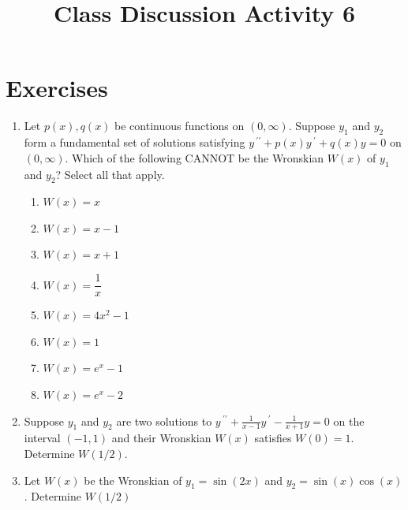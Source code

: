 \documentclass{ximera}
\begin{document}
\begin{abstract}
 \end{abstract}

    \title{Class Discussion Activity 6}
    
    \maketitle

\section*{Exercises}



\begin{enumerate}[label=(\arabic*)]

\item Let $p(x),q(x)$ be continuous functions on $(0,\infty)$.  Suppose $y_1$ and $y_2$ form a fundamental set of solutions satisfying $\displaystyle y\,^{\prime\prime}+p(x)y\,^{\prime}+q(x)y=0$ on $(0,\infty)$.  Which of the following CANNOT be the Wronskian $W(x)$ of $y_1$ and $y_2$?  Select all that apply.


\begin{enumerate}[label=(\alph*)]
\item  $W(x)=x$
\item  $W(x)=x-1$ %
\item  $W(x)=x+1$
\item  $W(x)=\dfrac{1}{x}$ 
\item  $W(x)=4x^2-1$ %
\item  $W(x)=1$
\item  $W(x)=e^x-1$
\item  $W(x)=e^x-2$ %
\end{enumerate}


\item Suppose $y_1$ and $y_2$ are two solutions to $\displaystyle y\,^{\prime\prime}+\frac{1}{x-1} y\,^{\prime}-\frac{1}{x+1}y=0$ on the interval $(-1,1)$ and their Wronskian $W(x)$ satisfies $W(0)=1$.  Determine $W(1/2)$.




\item  Let $W(x)$ be the Wronskian of $y_1=\sin (2x)$ and $y_2=\sin (x)\cos (x)$.  Determine $W(1/2)$


\end{enumerate}
\end{document}
